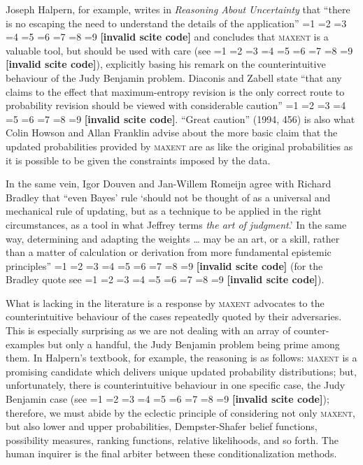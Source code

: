 \documentclass[smallextended]{svjour3}       %
\newcommand{\nonsc}[1]{}
\newcommand{\qeins}[1]{``#1''}
\newcommand{\qzwei}[1]{`#1'}
\newcommand{\PageP}{p.~}
\newcommand{\PageP}{}
\newcommand{\scite}[3]{\ifnum#1=1\cite{#2}\else
\ifnum#1=2\cite[{\PageP}~#3]{#2}\else
\ifnum#1=3\cite[{\PageP}~#3]{#2}\else
\ifnum#1=4\cite{#2}\else
\ifnum#1=5\cite{#2}\else
\ifnum#1=6\cite[{\PageP}~#3]{#2}\else
\ifnum#1=7\cite{#2}\else
\ifnum#1=8\cite[{\PageP}~#3]{#2}\else
\ifnum#1=9\cite[{\PageP}~#3]{#2}\else
\textbf{[invalid scite code]}\fi\fi\fi\fi\fi\fi\fi\fi\fi}
\begin{document}
Joseph Halpern, for example, writes in \emph{Reasoning About
  Uncertainty} that \qeins{there is no escaping the need to understand
  the details of the application} \scite{2}{halpern03}{423} and
concludes that \textsc{maxent} is a valuable tool, but should be used
with care (see \scite{8}{grovehalpern97}{110}), explicitly basing his
remark on the counterintuitive behaviour of the Judy Benjamin problem.
Diaconis and Zabell state \qeins{that any claims to the effect that
  maximum-entropy revision is the only correct route to probability
  revision should be viewed with considerable caution}
\scite{2}{diaconiszabell82}{829}. \qeins{Great caution} (1994,
456)\nonsc{} is also what Colin Howson and Allan Franklin advise about
the more basic claim that the updated probabilities provided by
\textsc{maxent} are as like the original probabilities as it is
possible to be given the constraints imposed by the data.

In the same vein, Igor Douven and Jan-Willem Romeijn agree with
Richard Bradley that \qeins{even Bayes' rule \qzwei{should not be
    thought of as a universal and mechanical rule of updating, but as
    a technique to be applied in the right circumstances, as a tool in
    what Jeffrey terms \emph{the art of judgment}.} In the same way,
  determining and adapting the weights {\ldots} may be an art, or a
  skill, rather than a matter of calculation or derivation from more
  fundamental epistemic principles} \scite{2}{douvenromeijn09}{16}
(for the Bradley quote see \scite{8}{bradley05}{362}).

What is lacking in the literature is a response by \textsc{maxent}
advocates to the counterintuitive behaviour of the cases repeatedly
quoted by their adversaries. This is especially surprising as we are
not dealing with an array of counter-examples but only a handful, the
Judy Benjamin problem being prime among them. In Halpern's textbook,
for example, the reasoning is as follows: \textsc{maxent} is a
promising candidate which delivers unique updated probability
distributions; but, unfortunately, there is counterintuitive behaviour
in one specific case, the Judy Benjamin case (see
\scite{8}{halpern03}{110, 119}); therefore, we must abide by the
eclectic principle of considering not only \textsc{maxent}, but also
lower and upper probabilities, Dempster-Shafer belief functions,
possibility measures, ranking functions, relative likelihoods, and so
forth. The human inquirer is the final arbiter between these
conditionalization methods.
\end{document}
